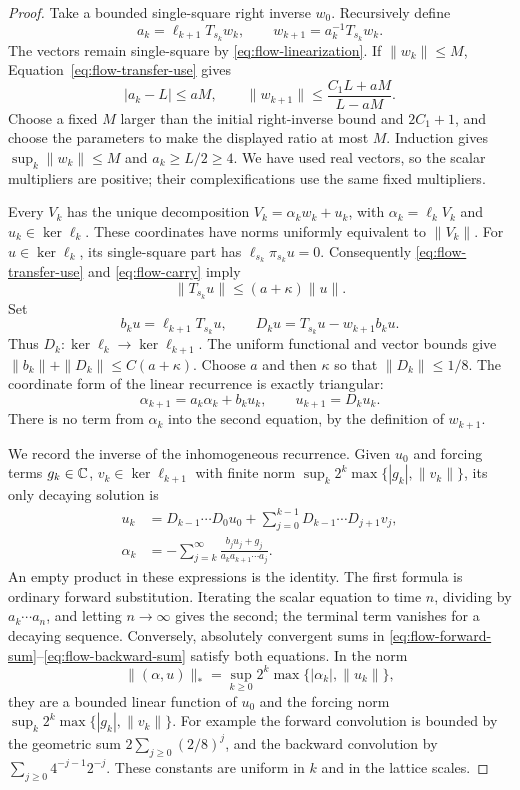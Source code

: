 \begin{proof}
Take a bounded single-square right inverse \(w_0\).  Recursively define
\[
 a_k=\ell_{k+1}T_{s_k}w_k,\qquad
 w_{k+1}=a_k^{-1}T_{s_k}w_k.
\]
The vectors remain single-square by \eqref{eq:flow-linearization}.  If
\(\|w_k\|\le M\), Equation~\eqref{eq:flow-transfer-use} gives
\[
 |a_k-L|\le aM,\qquad
 \|w_{k+1}\|\le\frac{C_1L+aM}{L-aM}.
\]
Choose a fixed \(M\) larger than the initial right-inverse bound and
\(2C_1+1\), and choose the parameters to make the displayed ratio at most
\(M\).  Induction gives \(\sup_k\|w_k\|\le M\) and
\(a_k\ge L/2\ge4\).  We have used real vectors, so the scalar multipliers
are positive; their complexifications use the same fixed multipliers.

Every \(V_k\) has the unique decomposition
\(V_k=\alpha_kw_k+u_k\), with \(\alpha_k=\ell_kV_k\) and
\(u_k\in\ker\ell_k\).  These coordinates have norms uniformly
equivalent to \(\|V_k\|\).  For \(u\in\ker\ell_k\), its single-square
part has \(\ell_{s_k}\pi_{s_k}u=0\).  Consequently
\eqref{eq:flow-transfer-use} and \eqref{eq:flow-carry} imply
\[
 \|T_{s_k}u\|\le(a+\kappa)\|u\|.
\]
Set
\[
 b_ku=\ell_{k+1}T_{s_k}u,\qquad
 D_ku=T_{s_k}u-w_{k+1}b_ku.
\]
Thus \(D_k:\ker\ell_k\to\ker\ell_{k+1}\).  The uniform functional
and vector bounds give \(\|b_k\|+\|D_k\|\le C(a+\kappa)\).
Choose \(a\) and then \(\kappa\) so that \(\|D_k\|\le1/8\).
The coordinate form of the linear recurrence is exactly triangular:
\begin{equation}\label{eq:flow-triangular}
 \alpha_{k+1}=a_k\alpha_k+b_ku_k,
 \qquad u_{k+1}=D_ku_k.
\end{equation}
There is no term from \(\alpha_k\) into the second equation, by the
definition of \(w_{k+1}\).

We record the inverse of the inhomogeneous recurrence.  Given \(u_0\)
and forcing terms \(g_k\in\mathbb C\), \(v_k\in\ker\ell_{k+1}\) with finite
norm \(\sup_k2^k\max\{|g_k|,\|v_k\|\}\), its only
decaying solution is
\begin{align}
 u_k&=D_{k-1}\cdots D_0u_0
       +\sum_{j=0}^{k-1}D_{k-1}\cdots D_{j+1}v_j,
       \label{eq:flow-forward-sum}\\
 \alpha_k&=-\sum_{j=k}^{\infty}
       \frac{b_ju_j+g_j}{a_k a_{k+1}\cdots a_j}.
       \label{eq:flow-backward-sum}
\end{align}
An empty product in these expressions is the identity.  The first formula
is ordinary forward substitution.  Iterating the scalar equation to time
\(n\), dividing by \(a_k\cdots a_n\), and letting \(n\to\infty\)
gives the second; the terminal term vanishes for a decaying sequence.
Conversely, absolutely convergent sums in
\eqref{eq:flow-forward-sum}--\eqref{eq:flow-backward-sum} satisfy both
equations.  In the norm
\[
 \|(\alpha,u)\|_*=
 \sup_{k\ge0}2^k\max\{|\alpha_k|,\|u_k\|\},
\]
they are a bounded linear function of \(u_0\) and the forcing norm
\(\sup_k2^k\max\{|g_k|,\|v_k\|\}\).  For example the forward
convolution is bounded by the geometric sum
\(2\sum_{j\ge0}(2/8)^j\), and the backward convolution by
\(\sum_{j\ge0}4^{-j-1}2^{-j}\).  These constants are uniform in \(k\)
and in the lattice scales.


\end{proof}
